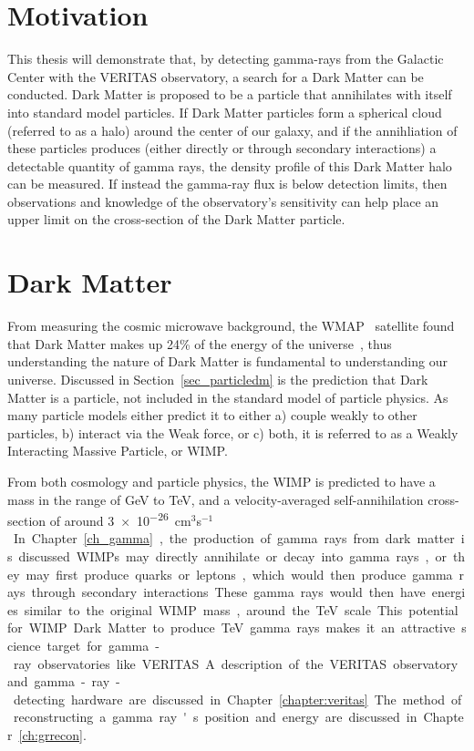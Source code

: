 \section{Motivation}
  This thesis will demonstrate that, by detecting gamma-rays from the Galactic Center with the VERITAS observatory, a search for a Dark Matter can be conducted.
  Dark Matter is proposed to be a particle that annihilates with itself into standard model particles.
  If Dark Matter particles form a spherical cloud (referred to as a halo) around the center of our galaxy, and if the annihliation of these particles produces (either directly or through secondary interactions) a detectable quantity of gamma rays, the density profile of this Dark Matter halo can be measured.
  If instead the gamma-ray flux is below detection limits, then observations and knowledge of the observatory's sensitivity can help place an upper limit on the cross-section of the Dark Matter particle.

\section{Dark Matter}

  From measuring the cosmic microwave background, the WMAP~\cite{wmap9year_obs} satellite found that Dark Matter makes up 24\% of the energy of the universe~\cite{pdg_2012}, thus understanding the nature of Dark Matter is fundamental to understanding our universe.
  Discussed in Section~\ref{sec_particledm} is the prediction that Dark Matter is a particle, not included in the standard model of particle physics.
  As many particle models either predict it to either a) couple weakly to other particles, b) interact via the Weak force, or c) both, it is referred to as a Weakly Interacting Massive Particle, or WIMP.

  From both cosmology and particle physics, the WIMP is predicted to have a mass in the range of GeV to TeV, and a velocity-averaged self-annihilation cross-section of around \nicetilde{}\SI{3e-26}{cm${}^3$s${}^{-1}$}.
  In Chapter~\ref{ch_gamma}, the production of gamma rays from dark matter is discussed.
  WIMPs may directly annihilate or decay into gamma rays, or they may first produce quarks or leptons, which would then produce gamma rays through secondary interactions.
  These gamma rays would then have energies similar to the original WIMP mass, around the TeV scale.
  This potential for WIMP Dark Matter to produce TeV gamma rays makes it an attractive science target for gamma-ray observatories like VERITAS.
  A description of the VERITAS observatory and gamma-ray-detecting hardware are discussed in Chapter~\ref{chapter:veritas}.
  The method of reconstructing a gamma ray's position and energy are discussed in Chapter~\ref{ch:grrecon}.

